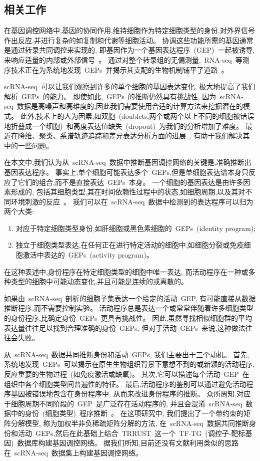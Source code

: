\subsection{相关工作}
在基因调控网络中,基因的协同作用,维持细胞作为特定细胞类型的身份,对外界信号作出反应,并进行复杂的如复制和代谢等细胞活动。
协调这些功能所需的基因通常是通过转录共同调控来实现的,
即基因作为一个基因表达程序~(GEP)~一起被诱导,
来响应适量的内部或外部信号~\cite{eisen1998cluster,segal2003module}。
通过对整个转录组的无偏测量,~RNA-seq~等测序技术正在为系统地发现~GEPs~并揭示其支配的生物机制铺平了道路~\cite{liberzon2015molecular}。

scRNA-seq~可以让我们观察到许多的单个细胞的基因表达变化,
极大地提高了我们解析~GEPs~的能力。
即使如此,~GEPs~的推断仍然具有挑战性,
因为~scRNA-seq~数据是高噪声和高维度的,因此我们需要使用合适的计算方法来挖掘潜在的模式。
此外,技术上的人为因素,如双胞~(doublets,两个或两个以上不同的细胞被错误地折叠成一个细胞)~和高度表达值缺失~(dropout)~为我们的分析增加了难度。
最近在降维、聚类、系谱轨迹追踪和差异表达分析方面的进展~\cite{amir2013visne,kharchenko2014bayesian,satija2015spatial,trapnell2014dynamics},
有助于我们解决其中的一些问题。

在本文中,我们认为从~scRNA-seq~数据中推断基因调控网络的关键是,准确推断出基因表达程序。
事实上,单个细胞可能表达多个~GEPs,但是单细胞表达谱本身只反应了它们的组合,而不是直接表达~GEPs~本身。
一个细胞的基因表达是由许多因素形成的,
包括其细胞类型,其在时间依赖性过程中的状态,如细胞周期,以及其对不同环境刺激的反应~\cite{wagner2016revealing}。
我们可以在~scRNA-seq~数据中检测到的表达程序可以归为两个大类:
\begin{enumerate}
    \item 对应于特定细胞类型身份,如肝细胞或黑色素细胞的~GEPs~(identity program);
    \item 独立于细胞类型表达,在任何正在进行特定活动的细胞中,如细胞分裂或免疫细胞激活中表达的~GEPs~(activity program)。
\end{enumerate}
在这种表述中,身份程序在特定细胞类型的细胞中唯一表达,
而活动程序在一种或多种类型的细胞中可能动态变化,并且可能是连续的或离散的。

如果由~scRNA-seq~剖析的细胞子集表达一个给定的活动~GEP,
有可能直接从数据推断程序,而不需要控制实验。
活动程序总是表达一个或常常伴随着许多细胞类型的身份程序,比确定身份~GEPs~更具有挑战性。
因此,虽然寻找相似细胞群的平均表达量往往足以找到合理准确的身份~GEPs,
但对于活动~GEPs~来说,这种做法往往会失败。

从~scRNA-seq~数据共同推断身份和活动~GEPs, 我们主要出于三个动机。
首先,系统地发现~GEPs~可以揭示在原生生物组织背景下意想不到的或新颖的活动程序,
反应重要的生物过程~(如免疫激活或缺氧)。
其次,它可以描述每个活动~GEP~在组织中各个细胞类型间普遍性的特征。
最后,活动程序的鉴别可以通过避免活动程序基因被错误地包含在身份程序中, 从而来改进身份程序的推断。
众所周知,对应于细胞周期不同阶段的~GEP~是广泛存在活动程序的,
并且会混淆~scRNA-seq~数据中的身份~(细胞类型)~程序推断~\cite{scialdone2015computational,chen2017controlling}。
在这项研究中, 我们提出了一个带约束的矩阵分解模型, 称为加权半非负稀疏矩阵分解的方法,
在~scRNA-seq~数据共同推断身份和活动~GEPs,然后在此基础上结合~TRRUST~这一个~TF-TG~(调控子-靶标基因)~数据库构建基因调控网络。
据我们所知,目前还没有文献利用类似的思路在~scRNA-seq~数据集上构建基因调控网络。

